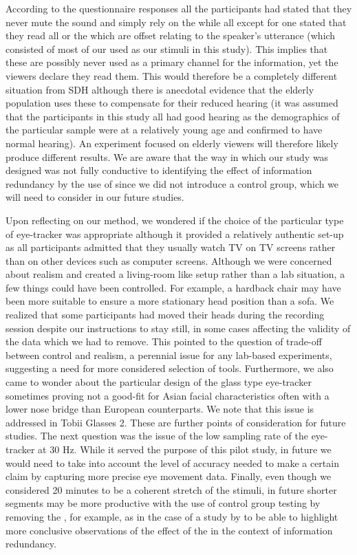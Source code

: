 \documentclass[output=paper]{langsci/langscibook}
\begin{document}
According to the questionnaire responses all the participants had stated that they never mute the sound and simply rely on the  while all except for one stated that they read all  or the  which are offset relating to the speaker's utterance (which consisted of most of our  used as our stimuli in this study). This implies that these  are possibly never used as a primary channel for the information, yet the viewers declare they read them. This would therefore be a completely different situation from SDH although there is anecdotal evidence that the elderly population uses these  to compensate for their reduced hearing (it was assumed that the participants in this study all had good hearing as the demographics of the particular sample were at a relatively young age and confirmed to have normal hearing). An experiment focused on elderly viewers will therefore likely produce different results. We are aware that the way in which our study was designed was not fully conductive to identifying the effect of information redundancy by the use of  since we did not introduce a control group, which we will need to consider in our future studies.    


Upon reflecting on our method, we wondered if the choice of the particular type of eye-tracker was appropriate although it provided a relatively authentic set-up as all participants admitted that they usually watch TV on TV screens rather than on other devices such as computer screens. Although we were concerned about realism and created a living-room like setup rather than a lab situation, a few things could have been controlled.  For example, a hardback chair may have been more suitable to ensure a more stationary head position than a sofa. We realized that some participants had moved their heads during the recording session despite our instructions to stay still, in some cases affecting the validity of the data which we had to remove. This pointed to the question of trade-off between control and realism, a perennial issue for any lab-based experiments, suggesting a need for more considered selection of  tools. Furthermore, we also came to wonder about the particular design of the glass type eye-tracker sometimes proving not a good-fit for Asian facial characteristics often with a lower nose bridge than European counterparts. We note that this issue is addressed in Tobii Glasses 2. These are further points of consideration for future studies. The next question was the issue of the low sampling rate of the eye-tracker at 30 Hz. While it served the purpose of this pilot study, in future we would need to take into account the level of accuracy needed to make a certain claim by capturing more precise eye movement data.  Finally, even though we considered 20 minutes to be a coherent stretch of the stimuli, in future shorter segments may be more productive with the use of control group testing by removing the , for example, as in the case of a study by \citet{Matsukawa2009} to be able to highlight more conclusive observations of the effect of the  in the context of information redundancy.   
\end{document}
